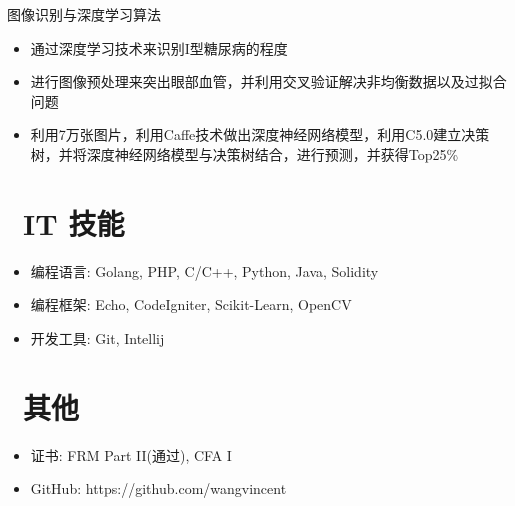\documentclass{resume}
\begin{document}
\begin{onehalfspacing}
图像识别与深度学习算法
\begin{itemize}
  \item 通过深度学习技术来识别I型糖尿病的程度
  \item 进行图像预处理来突出眼部血管，并利用交叉验证解决非均衡数据以及过拟合问题
  \item 利用7万张图片，利用Caffe技术做出深度神经网络模型，利用C5.0建立决策树，并将深度神经网络模型与决策树结合，进行预测，并获得Top25\%
\end{itemize}
\end{onehalfspacing}


\section{\faCogs\ IT 技能}
\begin{itemize}[parsep=0.5ex]
  \item 编程语言: Golang, PHP, C/C++, Python, Java, Solidity
  \item 编程框架: Echo, CodeIgniter, Scikit-Learn, OpenCV
  \item 开发工具: Git, Intellij
\end{itemize}

\section{\faInfo\ 其他}
\begin{itemize}[parsep=0.5ex]
  \item 证书: FRM Part II(通过), CFA I
  \item GitHub: https://github.com/wangvincent
\end{itemize}

%
%
\end{document}
